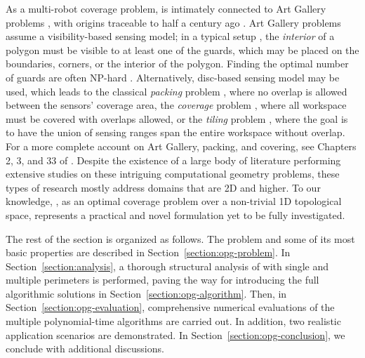 As a multi-robot coverage problem, \opg is intimately connected to Art 
Gallery problems \cite{o1987art,shermer1992recent}, with origins traceable 
to half a century ago \cite{klee1969every}. Art Gallery problems assume 
a visibility-based \cite{lozano1979algorithm} sensing model; in a typical 
setup \cite{o1987art}, the {\em interior} of a polygon must be visible to at 
least one of the guards, which may be placed on the boundaries, corners, 
or the interior of the polygon. Finding the optimal number of guards are 
often NP-hard \cite{lee1986computational}. Alternatively, disc-based sensing 
model may be used, which leads to the classical {\em packing} problem 
\cite{thue1910dichteste,hales2005proof}, where no overlap is allowed between 
the sensors' coverage area, the {\em coverage} problem 
\cite{drezner1995facility,cortes2004coverage,pavone2009equitable,martinez2010distributed,pierson2017adapting}, 
where all 
workspace must be covered with overlaps allowed, or the {\em tiling} problem 
\cite{kershner1968paving}, where the goal is to have the union of sensing
ranges span the entire workspace without overlap. For a more complete 
account on Art Gallery, packing, and covering, see Chapters 2, 3, and 33 of
\cite{toth2017handbook}. Despite the existence of a large body of literature 
performing extensive studies on these intriguing computational geometry 
problems, these types of research mostly address domains that are 2D and 
higher. To our knowledge, \opg, as an optimal coverage problem over 
a non-trivial 1D topological space, represents a practical and novel formulation 
yet to be fully investigated. 

The rest of the section is organized as follows. 
%
The \opg problem and some of its most basic properties are described 
in Section~\ref{section:opg-problem}. 
%
In Section~\ref{section:analysis}, a thorough structural analysis of \opg 
with single and multiple perimeters is performed, paving the way for 
introducing the full algorithmic solutions in Section~\ref{section:opg-algorithm}.
%
Then, in Section~\ref{section:opg-evaluation}, comprehensive numerical 
evaluations of the multiple polynomial-time algorithms are carried out. 
In addition, two realistic application scenarios are demonstrated. 
%
In Section~\ref{section:opg-conclusion}, we conclude with  
additional discussions. 
